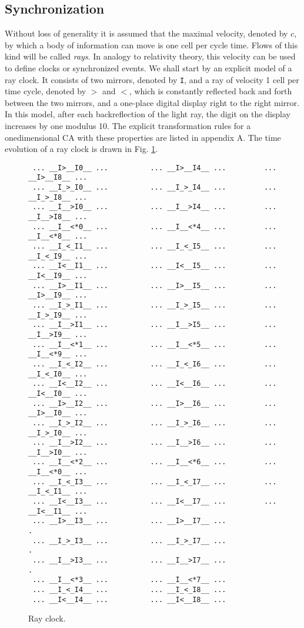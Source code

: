 \documentclass[pra,amsfonts, twocolumn]{revtex4}
\begin{document}
\subsection{Synchronization}

 Without loss of generality it is assumed that the maximal velocity,
 denoted by $c$, by which a body of information can move is one
 cell per cycle time.
 Flows of this kind will be called {\em rays}.
 In analogy to relativity theory, this velocity can be used to define
 clocks or
 synchronized events. We shall start by an explicit model of a ray
 clock. It consists of two mirrors, denoted by {\tt I}, and a ray of
velocity 1 cell per time cycle, denoted by $>$ and $<$, which is
constantly reflected back and forth between the two mirrors, and a
one-place digital display right to the right mirror. In this model,
after each
backreflection of the light ray, the digit on the display increases by
one modulus 10.
The explicit transformation rules for a onedimensional CA with these
properties are listed in appendix A.
The time evolution of a ray clock is drawn in Fig. \ref{ray-clock}.
\begin{figure}
 {\tiny
 \begin{verbatim}
 ... __I>__I0__ ...          ... __I>__I4__ ...         ... __I>__I8__ ...
 ... __I_>_I0__ ...          ... __I_>_I4__ ...         ... __I_>_I8__ ...
 ... __I__>I0__ ...          ... __I__>I4__ ...         ... __I__>I8__ ...
 ... __I__<*0__ ...          ... __I__<*4__ ...         ... __I__<*8__ ...
 ... __I_<_I1__ ...          ... __I_<_I5__ ...         ... __I_<_I9__ ...
 ... __I<__I1__ ...          ... __I<__I5__ ...         ... __I<__I9__ ...
 ... __I>__I1__ ...          ... __I>__I5__ ...         ... __I>__I9__ ...
 ... __I_>_I1__ ...          ... __I_>_I5__ ...         ... __I_>_I9__ ...
 ... __I__>I1__ ...          ... __I__>I5__ ...         ... __I__>I9__ ...
 ... __I__<*1__ ...          ... __I__<*5__ ...         ... __I__<*9__ ...
 ... __I_<_I2__ ...          ... __I_<_I6__ ...         ... __I_<_I0__ ...
 ... __I<__I2__ ...          ... __I<__I6__ ...         ... __I<__I0__ ...
 ... __I>__I2__ ...          ... __I>__I6__ ...         ... __I>__I0__ ...
 ... __I_>_I2__ ...          ... __I_>_I6__ ...         ... __I_>_I0__ ...
 ... __I__>I2__ ...          ... __I__>I6__ ...         ... __I__>I0__ ...
 ... __I__<*2__ ...          ... __I__<*6__ ...         ... __I__<*0__ ...
 ... __I_<_I3__ ...          ... __I_<_I7__ ...         ... __I_<_I1__ ...
 ... __I<__I3__ ...          ... __I<__I7__ ...         ... __I<__I1__ ...
 ... __I>__I3__ ...          ... __I>__I7__ ...               .
 ... __I_>_I3__ ...          ... __I_>_I7__ ...               .
 ... __I__>I3__ ...          ... __I__>I7__ ...               .
 ... __I__<*3__ ...          ... __I__<*7__ ...
 ... __I_<_I4__ ...          ... __I_<_I8__ ...
 ... __I<__I4__ ...          ... __I<__I8__ ...
 \end{verbatim}  }
\caption{Ray clock. \label{ray-clock}}
\end{figure}
\end{document}
